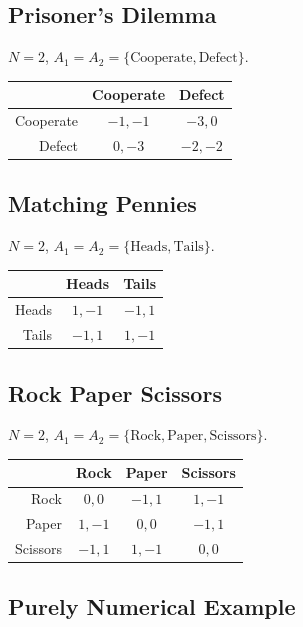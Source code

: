 \documentclass[11pt]{article}
\theoremstyle{definition}
\theoremstyle{plain}
\begin{document}
\subsection*{Prisoner's Dilemma}

$N =  2$, $A_1 = A_2 = \{\text{Cooperate}, \text{Defect}\}$.

\begin{center}
\begin{tabular}{r|c|c|}
  & Cooperate & Defect \\\hline
Cooperate & $-1, -1$ & $-3, 0$ \\\hline
Defect & $0, -3$ & $-2, -2$ \\\hline
\end{tabular}
\end{center}

\subsection*{Matching Pennies}

$N = 2$, $A_1 = A_2 = \{\text{Heads}, \text{Tails}\}$.

\begin{center}
\begin{tabular}{r|c|c|}
  & Heads & Tails \\\hline
Heads & $1, -1$ & $-1, 1$ \\\hline
Tails & $-1, 1$ & $1, -1$ \\\hline
\end{tabular}
\end{center}

\subsection*{Rock Paper Scissors}

$N = 2$, $A_1 = A_2 = \{\text{Rock}, \text{Paper}, \text{Scissors}\}$.

\begin{center}
\begin{tabular}{r|c|c|c|}
  & Rock & Paper & Scissors \\\hline
Rock & $0, 0$ & $-1, 1$ & $1, -1$ \\\hline
Paper & $1, -1$ & $0, 0$ & $-1, 1$ \\\hline
Scissors & $-1, 1$ & $1, -1$ & $0, 0$ \\\hline
\end{tabular}
\end{center}

\subsection*{Purely Numerical Example}
\end{document}
